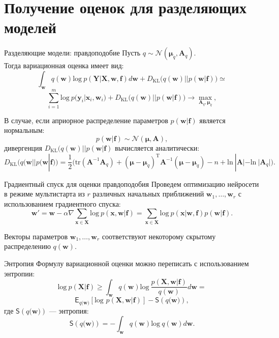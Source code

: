 \documentclass[10pt,pdf,utf8,russian,aspectratio=169]{beamer}
\begin{document}
\section{Получение оценок для разделяющих моделей}
\begin{frame}{Разделяющие модели: правдоподобие}
Пусть $q \sim \mathcal{N}(\boldsymbol{\mu}_q, \mathbf{A}_q).$\\
Тогда вариационная оценка имеет вид:
$$
\int_{\mathbf{w}} q(\mathbf{w})\text{log}~{p(\mathbf{Y}|\mathbf{X},\mathbf{w},\mathbf{f})} d \mathbf{w} + D_\text{KL}\bigl(q (\mathbf{w} )|| p (\mathbf{w}|\mathbf{f})\bigr) \simeq
$$
$$
\sum_{i=1}^m \text{log}~p(\mathbf{y}_i|\mathbf{x}_i, \mathbf{w}_i) + D_\text{KL}\bigl(q (\mathbf{w} )|| p (\mathbf{w}|\mathbf{f})\bigr) \to \max_{\mathbf{A}_q, \boldsymbol{\mu}_q},
$$

В случае, если априорное распределение параметров $p(\mathbf{w}|\mathbf{f})$ является нормальным: 
$$
p(\mathbf{w}|\mathbf{f}) \sim \mathcal{N}(\boldsymbol{\mu}, \mathbf{A}),
$$
дивергенция $D_\text{KL}\bigl(q (\mathbf{w} )|| p (\mathbf{w}|\mathbf{f})$ вычисляется аналитически:
$$
D_\text{KL}\bigl(q (\mathbf{w} || p (\mathbf{w}|\mathbf{f})\bigr) = \frac{1}{2} \bigl( \text{tr} (\mathbf{A}^{-1}\mathbf{A}_q) + (\boldsymbol{\mu} - \boldsymbol{\mu}_q)^\text{T}\mathbf{A}^{-1}(\boldsymbol{\mu} - \boldsymbol{\mu}_q) - n +\text{ln}~|\mathbf{A}| - \text{ln}~|\mathbf{A}_q| \bigr).
$$
\end{frame}




\begin{frame}{Градиентный спуск для оценки правдоподобия}
Проведем оптимизацию нейросети в режиме мультистарта из $r$ различных начальных приближений $\mathbf{w}_1, \dots, \mathbf{w}_r$ с использованием градиентного спуска:
\[
\mathbf{w}' = \mathbf{w} - \alpha  \nabla \sum_{\mathbf{x} \in \mathbf{X}} \text{log}~p(\mathbf{x},\mathbf{w}|\mathbf{f}) = \sum_{\mathbf{x} \in \mathbf{X}} \text{log}~p(\mathbf{x}|\mathbf{w}, \mathbf{f}) p(\mathbf{w}|\mathbf{f}).
\]

Векторы параметров $\mathbf{w}_1,\dots,\mathbf{w}_r$ соответствуют некоторому скрытому распределению $q(\mathbf{w})$.

\end{frame}

\begin{frame}{Энтропия}
Формулу вариационной оценки можно переписать с использованием энтропии:
$$\text{log}~p(\mathbf{X}|\mathbf{f}) \geq 
\int_{\mathbf{w}} q(\mathbf{w})\text{log}~\frac{p(\mathbf{X},\mathbf{w}|\mathbf{f})}{q(\mathbf{w})}d\mathbf{w} = 
$$
$$
\mathsf{E}_{q(\mathbf{w)}}[\text{log~}p (\mathbf{X}, \mathbf{w}| \mathbf{f})] - \mathsf{S}({q(\mathbf{w)}}),
$$
где $\mathsf{S}({q(\mathbf{w)}})$ --- энтропия:
$$
\mathsf{S}({q(\mathbf{w)}}) = - \int_{\mathbf{w}} q(\mathbf{w})\text{log}~q(\mathbf{w})d\mathbf{w}.  	
$$


\end{frame}
\end{document}
